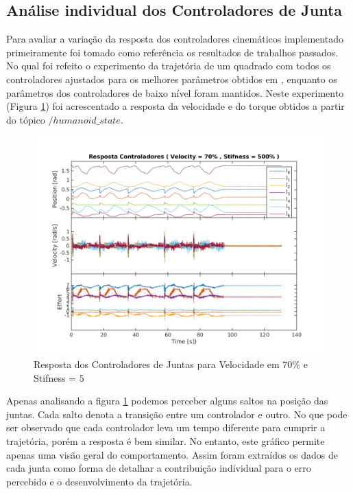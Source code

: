 \subsection{Análise individual dos Controladores de Junta}

Para avaliar a variação da resposta dos controladores cinemáticos implementado primeiramente foi tomado como referência os resultados de trabalhos passados. No qual foi refeito o experimento da trajetória de um quadrado com todos os controladores ajustados para os melhores parâmetros obtidos em \cite{marcosps2016}, enquanto os parâmetros dos controladores de baixo nível foram mantidos. Neste experimento (Figura \ref{fig:squareStiffMarcos}) foi acrescentado a resposta da velocidade e do torque obtidos a partir do tópico $/humanoid\_state$.

\vspace{1cm}

\begin{figure}[H]
    \centering
    \includegraphics[width=0.8\linewidth,trim={2cm 1cm 2cm 2cm}]{tex/figs/squareStifff4stateEvalv70s500.png}
    \caption{Resposta dos Controladores de Juntas para Velocidade em $70\%$ e Stifness = $5$ }
    \label{fig:squareStiffMarcos}
\end{figure}

Apenas analisando a figura \ref{fig:squareStiffMarcos} podemos perceber alguns saltos na posição das juntas. Cada salto denota a transição entre um controlador e outro. No que pode ser observado que cada controlador leva um tempo diferente para cumprir a trajetória, porém a resposta é bem similar. No entanto, este gráfico permite apenas uma visão geral do comportamento. Assim foram extraídos os dados de cada junta como forma de detalhar a contribuição individual para o erro percebido e o desenvolvimento da trajetória.

